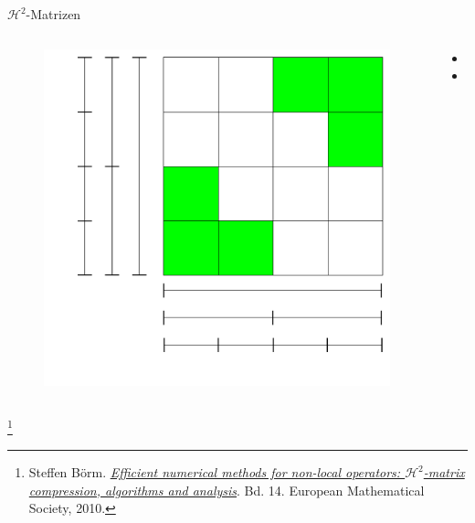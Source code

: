 \documentclass[10pt]{beamer}
\let\svthefootnote\thefootnote
\begin{document}
\begin{frame}{\(\mathcal{H}^2\)-Matrizen}
\begin{columns}
\begin{figure}
\begin{overprint}
          \centering\includegraphics[width=\linewidth]{figures/fg-h2-matrix-3.pdf}
        \end{overprint}
      \end{figure}
      \begin{itemize}
        \item {}
        \item {}
      \end{itemize}
      
  \end{columns}

  \footnotesize
  \let\thefootnote\relax\footnote{Steffen B{\"o}rm.
  \href{https://books.google.de/books/about/Efficient_Numerical_Methods_for_Non_loca.html?id=awMabNC9DTkC&redir_esc=y}
  {\textit{Efficient numerical methods for non-local operators: \(
   \mathcal{H}^{2} \)-matrix compression, algorithms and analysis}}. Bd. 14.  
   European Mathematical Society, 2010.}
  \addtocounter{footnote}{-1}\let\thefootnote\svthefootnote\relax
  \normalsize
\end{frame}
\end{document}
